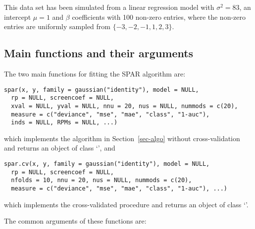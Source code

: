 \documentclass[
  article]{jss}
\newcommand{\class}[1]{`\code{#1}'}
\begin{document}
This data set has been simulated from a linear regression model with
\(\sigma^2=83\), an intercept \(\mu=1\) and \(\beta\) coefficients with
100 non-zero entries, where the non-zero entries are uniformly sampled
from \(\{-3,-2,-1,1,2,3\}\).

\subsection{Main functions and their
arguments}\label{main-functions-and-their-arguments}

The two main functions for fitting the SPAR algorithm are:

\begin{verbatim}
spar(x, y, family = gaussian("identity"), model = NULL, 
  rp = NULL, screencoef = NULL,
  xval = NULL, yval = NULL, nnu = 20, nus = NULL, nummods = c(20),
  measure = c("deviance", "mse", "mae", "class", "1-auc"),
  inds = NULL, RPMs = NULL, ...)
\end{verbatim}

which implements the algorithm in Section~\ref{sec-algo} without
cross-validation and returns an object of class \class{spar}, and

\begin{verbatim}
spar.cv(x, y, family = gaussian("identity"), model = NULL, 
  rp = NULL, screencoef = NULL,
  nfolds = 10, nnu = 20, nus = NULL, nummods = c(20),
  measure = c("deviance", "mse", "mae", "class", "1-auc"), ...)
\end{verbatim}

which implements the cross-validated procedure and returns an object of
class \class{spar.cv}.

The common arguments of these functions are:
\end{document}
